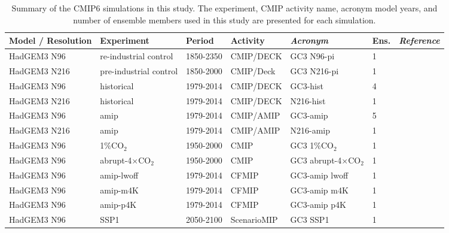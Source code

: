 \begin{sidewaystable}
\small
\caption{Summary of the CMIP6 simulations in this study. The experiment, CMIP activity name, acronym model years, and number of ensemble members used in this study are presented for each simulation.}
\begin{tabular}{p{3.1cm}|p{3.8cm}p{}p{2.8cm}p{3.5cm}p{0.9cm}p{3.6cm}} \label{tab:Sexps} \small
 Model / Resolution & Experiment & Period & Activity & \textit{Acronym}  & Ens. & \textit{Reference}                 \\ \hline \hline

HadGEM3 N96    &  re-industrial control  & 1850-2350 & CMIP/DECK & GC3 N96-pi      & 1 &   \citep{menary2018,gc3pi}                          \\
HadGEM3 N216  &  pre-industrial control & 1850-2000        & CMIP/Deck & GC3 N216-pi   & 1 & \citep{menary2018,n216pi}      \\
HadGEM3 N96    &  historical & 1979-2014       & CMIP/DECK & GC3-hist     &  4 & \citep{andrews2020,gc3hist}                          \\
HadGEM3 N216   &  historical & 1979-2014        & CMIP/DECK & N216-hist   & 1 & \citep{n216pi}      \\
HadGEM3 N96   & amip  & 1979-2014 & CMIP/AMIP  & GC3-amip   & 5  &   \citep{gc3amip}                          \\
HadGEM3 N216   & amip  & 1979-2014 & CMIP/AMIP  & N216-amip   & 1  &   \citep{gc3amip}                          \\
HadGEM3 N96   & 1$\%$CO$_2$  & 1950-2000 & CMIP  & GC3 1$\%$CO$_2$   & 1  &   \citep{gc3amip}                          \\
HadGEM3 N96   & abrupt-4$\times$CO$_2$  & 1950-2000 & CMIP  & GC3 abrupt-4$\times$CO$_2$   & 1  &   \citep{gc3amip}                          \\
HadGEM3 N96   & amip-lwoff  & 1979-2014 & CFMIP  & GC3-amip lwoff   & 1  &   \citep{webb2017}                          \\
HadGEM3 N96   & amip-m4K & 1979-2014 & CFMIP  & GC3-amip m4K  & 1  &   \citep{webb2017}                          \\
HadGEM3 N96   & amip-p4K & 1979-2014 & CFMIP  & GC3-amip p4K  & 1  &   \citep{webb2017}                          \\
HadGEM3 N96   & SSP1 & 2050-2100 & ScenarioMIP  & GC3 SSP1 & 1  &   \citep{o2016}                          \\

\end{tabular}
\end{sidewaystable}
